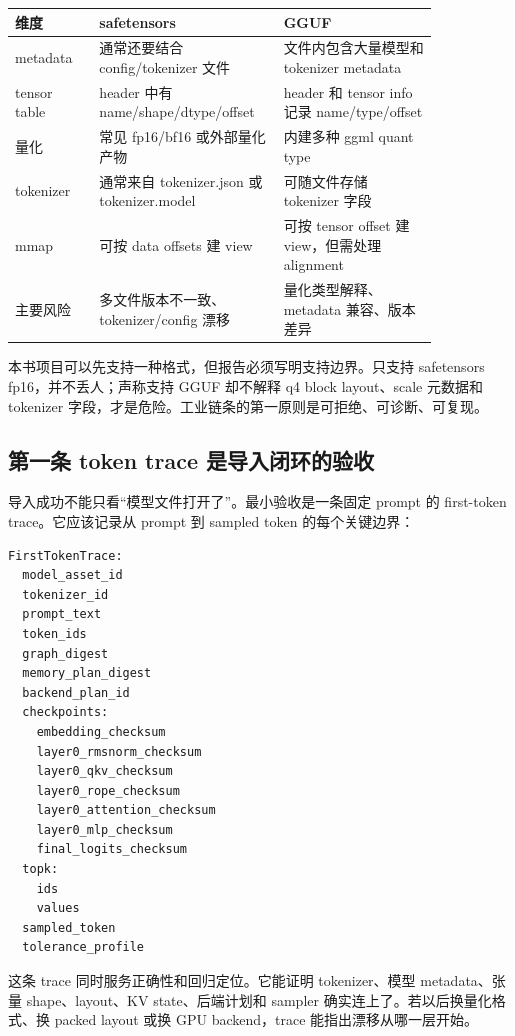 \begin{center}
\small
\begin{tabular}{p{0.18\linewidth}p{0.33\linewidth}p{0.33\linewidth}}
\toprule
维度 & safetensors & GGUF \\
\midrule
metadata & 通常还要结合 config/tokenizer 文件 & 文件内包含大量模型和 tokenizer metadata \\
tensor table & header 中有 name/shape/dtype/offset & header 和 tensor info 记录 name/type/offset \\
量化 & 常见 fp16/bf16 或外部量化产物 & 内建多种 ggml quant type \\
tokenizer & 通常来自 tokenizer.json 或 tokenizer.model & 可随文件存储 tokenizer 字段 \\
mmap & 可按 data offsets 建 view & 可按 tensor offset 建 view，但需处理 alignment \\
主要风险 & 多文件版本不一致、tokenizer/config 漂移 & 量化类型解释、metadata 兼容、版本差异 \\
\bottomrule
\end{tabular}
\end{center}

本书项目可以先支持一种格式，但报告必须写明支持边界。只支持 safetensors fp16，并不丢人；声称支持 GGUF 却不解释 q4 block layout、scale 元数据和 tokenizer 字段，才是危险。工业链条的第一原则是可拒绝、可诊断、可复现。

\subsection{第一条 token trace 是导入闭环的验收}

导入成功不能只看“模型文件打开了”。最小验收是一条固定 prompt 的 first-token trace。它应该记录从 prompt 到 sampled token 的每个关键边界：

\begin{lstlisting}[numbers=none,caption={first-token trace 的核心字段}]
FirstTokenTrace:
  model_asset_id
  tokenizer_id
  prompt_text
  token_ids
  graph_digest
  memory_plan_digest
  backend_plan_id
  checkpoints:
    embedding_checksum
    layer0_rmsnorm_checksum
    layer0_qkv_checksum
    layer0_rope_checksum
    layer0_attention_checksum
    layer0_mlp_checksum
    final_logits_checksum
  topk:
    ids
    values
  sampled_token
  tolerance_profile
\end{lstlisting}

这条 trace 同时服务正确性和回归定位。它能证明 tokenizer、模型 metadata、张量 shape、layout、KV state、后端计划和 sampler 确实连上了。若以后换量化格式、换 packed layout 或换 GPU backend，trace 能指出漂移从哪一层开始。

